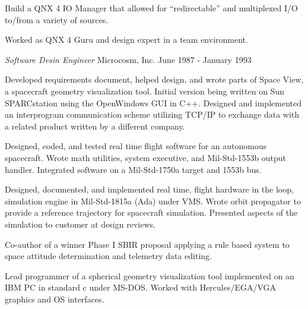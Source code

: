 \documentclass[margin]{res}
\begin{document}
\begin{resume}
                Build a QNX 4 IO Manager that allowed for
                “redirectable” and multiplexed I/O to/from a variety
                of sources.

                Worked as QNX 4 Guru and design expert in a team
                environment.

                {\sl Software Desin Engineer } Microcosm, Inc. \hfill June 1987 - January 1993

                Developed requirements document, helped design, and wrote
                parts of Space View, a spacecraft geometry visualization
                tool. Initial version being written on Sun SPARCstation
                using the OpenWindows GUI in C++. Designed and implemented
                an interprogram communication scheme utilizing TCP/IP
                to exchange data with a related product written by a
                different company.

                Designed, coded, and tested real time flight software for
                an autonomous spacecraft. Wrote math utilities, system
                executive, and Mil-Std-1553b output handler. Integrated
                software on a Mil-Std-1750a target and 1553b bus.

                Designed, documented, and implemented real time, flight
                hardware in the loop, simulation engine in Mil-Std-1815a
                (Ada) under VMS. Wrote orbit propagator to provide a
                reference trajectory for spacecraft simulation. Presented
                aspects of the simulation to customer at design reviews.

                Co-author of a winner Phase I SBIR proposal applying a
                rule based system to space attitude determination and
                telemetry data editing.

                Lead programmer of a spherical geometry visualization
                tool implemented on an IBM PC in standard c under
                MS-DOS. Worked with Hercules/EGA/VGA graphics and OS
                interfaces.

\end{resume}
\end{document}
